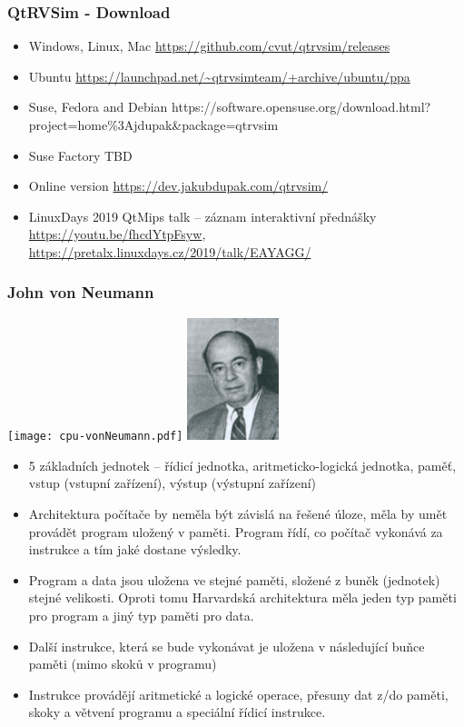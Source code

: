 \documentclass{beamer}
\begin{document}
\begin{frame}
\frametitle{QtRVSim - Download}
\begin{itemize}
\item Windows, Linux, Mac
\url{https://github.com/cvut/qtrvsim/releases}
\item  Ubuntu
\url{https://launchpad.net/~qtrvsimteam/+archive/ubuntu/ppa}
\item Suse, Fedora and Debian
https://software.opensuse.org/download.html?project=home\%3Ajdupak&package=qtrvsim
\item Suse Factory TBD
\item Online version \url{https://dev.jakubdupak.com/qtrvsim/}
\item LinuxDays 2019 QtMips talk – záznam interaktivní přednášky
\url{https://youtu.be/fhcdYtpFsyw}, \url{https://pretalx.linuxdays.cz/2019/talk/EAYAGG/}
\end{itemize}
\end{frame}

\begin{frame}[shrink=5]
\frametitle{John von Neumann}
\begin{center}
\texttt{[image: cpu-vonNeumann.pdf]}
\hfill
\includegraphics[width=0.2\textwidth]{fig/vonNeumann.png}
\end{center}
\begin{itemize}
\item 5 základních jednotek – řídicí jednotka, aritmeticko-logická jednotka, paměť, vstup (vstupní zařízení), výstup (výstupní zařízení)
\item Architektura počítače by neměla být závislá na řešené úloze, měla by umět provádět program uložený v paměti. Program řídí, co počítač vykonává za instrukce a tím jaké dostane výsledky.
\item Program a data jsou uložena ve stejné paměti, složené z buněk (jednotek) stejné velikosti. Oproti tomu Harvardská architektura měla jeden typ paměti pro program a jiný typ paměti pro data.
\item Další instrukce, která se bude vykonávat je uložena v následující buňce paměti (mimo skoků v programu)
\item Instrukce provádějí aritmetické a logické operace, přesuny dat z/do paměti, skoky a větvení programu a speciální řídicí instrukce.
\end{itemize}
\end{frame}
\end{document}
